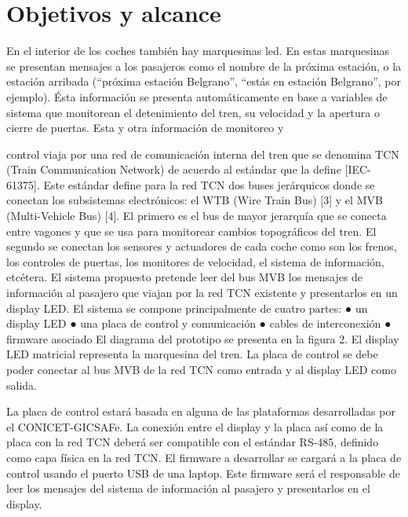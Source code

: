 \pagebreak
\section{Objetivos y alcance}

En el interior de los coches también hay marquesinas led. En estas marquesinas se presentan
mensajes a los pasajeros como el nombre de la próxima estación, o la estación arribada
(“próxima estación Belgrano”, “estás en estación Belgrano”, por ejemplo). Ésta información se
presenta automáticamente en base a variables de sistema que monitorean el detenimiento del
tren, su velocidad y la apertura o cierre de puertas. Esta y otra información de monitoreo y

control viaja por una red de comunicación interna del tren que se denomina TCN (Train
Communication Network) de acuerdo al estándar que la define [IEC-61375]. Este estándar define
para la red TCN dos buses jerárquicos donde se conectan los subsistemas electrónicos: el WTB
(Wire Train Bus) [3] y el MVB (Multi-Vehicle Bus) [4]. El primero es el bus de mayor jerarquía que
se conecta entre vagones y que se usa para monitorear cambios topográficos del tren. El
segundo se conectan los sensores y actuadores de cada coche como son los frenos, los
controles de puertas, los monitores de velocidad, el sistema de información, etcétera.
El sistema propuesto pretende leer del bus MVB los mensajes de información al pasajero que
viajan por la red TCN existente y presentarlos en un display LED. El sistema se compone
principalmente de cuatro partes:
● un display LED
● una placa de control y comunicación
● cables de interconexión
● firmware asociado
El diagrama del prototipo se presenta en la figura 2. El display LED matricial representa la
marquesina del tren. La placa de control se debe poder conectar al bus MVB de la red TCN
como entrada y al display LED como salida.


La placa de control estará basada en alguna de las plataformas desarrolladas por el
CONICET-GICSAFe. La conexión entre el display y la placa así como de la placa con la red TCN
deberá ser compatible con el estándar RS-485, definido como capa física en la red TCN. El
firmware a desarrollar se cargará a la placa de control usando el puerto USB de una laptop. Este
firmware será el responsable de leer los mensajes del sistema de información al pasajero y
presentarlos en el display.



